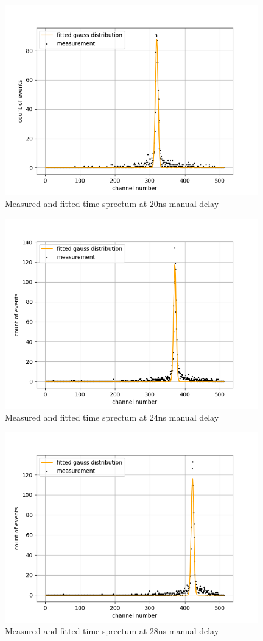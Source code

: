 \begin{figure}[H]
    \centering
    \includegraphics[width=110mm,scale=0.5]{Positronium/include/timecalibration5.png}
    \caption{Measured and fitted time sprectum at 20ns manual delay} 
    \label{fig:0nsnofit}
\end{figure}

\begin{figure}[H]
    \centering
    \includegraphics[width=110mm,scale=0.5]{Positronium/include/timecalibration6.png}
    \caption{Measured and fitted time sprectum at 24ns manual delay} 
    \label{fig:0nsnofit}
\end{figure}

\begin{figure}[H]
    \centering
    \includegraphics[width=110mm,scale=0.5]{Positronium/include/timecalibration7.png}
    \caption{Measured and fitted time sprectum at 28ns manual delay} 
    \label{fig:0nsnofit}
\end{figure}


